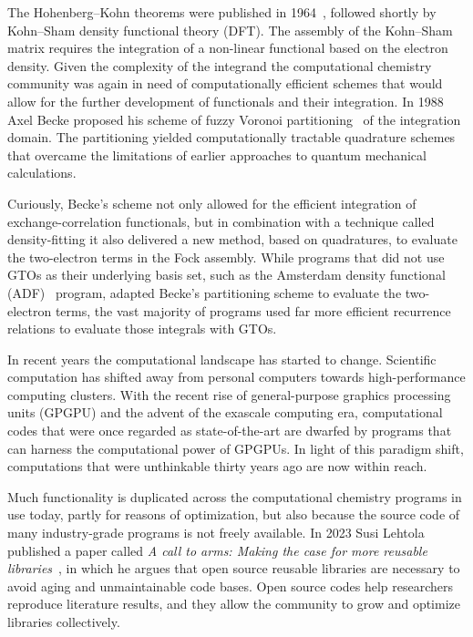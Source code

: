 \documentclass{article}
\begin{document}
The Hohenberg--Kohn theorems were published in
1964~\cite{Hohenberg1964}, followed shortly by Kohn--Sham density
functional theory (DFT).\cite{Kohn1965} The assembly of the Kohn--Sham
matrix requires the integration of a non-linear functional based on
the electron density. Given the
complexity of the integrand the computational chemistry community was
again in need of computationally efficient schemes that would
allow for the further development of functionals and their
integration. In 1988 Axel Becke proposed
his scheme of fuzzy Voronoi partitioning~\cite{Becke_1988} of the
integration domain.
The partitioning yielded computationally tractable quadrature
schemes that overcame the limitations of earlier approaches to
quantum mechanical calculations.

Curiously, Becke's scheme not only allowed for the efficient
integration of exchange-correlation functionals, but in combination
with a technique called density-fitting it also
delivered a new method, based on quadratures, to evaluate the
two-electron terms in the Fock assembly.\cite{Cohen2002, Watson2003}
While programs that did not use GTOs as their underlying basis set,
such as the Amsterdam density functional (ADF)~\cite{VanLenthe2003,
Franchini2013} program, adapted Becke's
partitioning scheme to
evaluate the two-electron terms, the vast majority of programs used
far more efficient recurrence relations to evaluate those integrals
with GTOs.\cite{Ahlrichs2006}

In recent years the computational landscape has started to
change. Scientific computation has shifted away from personal
computers towards high-performance computing
clusters.\cite{Gavini2023} With the
recent rise of general-purpose graphics processing units (GPGPU) and
the advent of the exascale computing era, computational codes that
were once regarded as state-of-the-art are dwarfed by programs that can
harness the computational power of
GPGPUs.\cite{GalvezVallejo2023, Stocks_2025, WilliamsYoung2021} In
light of this paradigm
shift, computations that were unthinkable thirty years ago are now
within reach.

Much functionality is duplicated across the computational chemistry
programs in use today, partly for reasons of optimization, but also
because the source code of many industry-grade programs is not freely
available. In 2023 Susi Lehtola published a
paper called \emph{A call to arms: Making the case for more reusable
libraries}~\cite{Lehtola2023c}, in which he argues that open source
reusable libraries are necessary to avoid aging and unmaintainable
code bases. Open source codes help researchers reproduce literature
results, and they allow the community to grow and optimize libraries
collectively.
\end{document}
